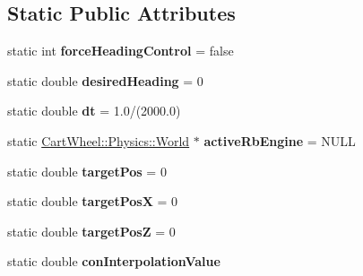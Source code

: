 \subsection*{Static Public Attributes}
\begin{DoxyCompactItemize}
\item 
\hypertarget{classCartWheel_1_1Core_1_1SimGlobals_a1040005439b9320e9456935548db3b07}{
static int {\bfseries forceHeadingControl} = false}
\label{classCartWheel_1_1Core_1_1SimGlobals_a1040005439b9320e9456935548db3b07}

\item 
\hypertarget{classCartWheel_1_1Core_1_1SimGlobals_acb2a9bbb3eec104b912c9d5d411ea239}{
static double {\bfseries desiredHeading} = 0}
\label{classCartWheel_1_1Core_1_1SimGlobals_acb2a9bbb3eec104b912c9d5d411ea239}

\item 
\hypertarget{classCartWheel_1_1Core_1_1SimGlobals_a2c9bfa76224e96109d71bd2b9ffd6e3e}{
static double {\bfseries dt} = 1.0/(2000.0)}
\label{classCartWheel_1_1Core_1_1SimGlobals_a2c9bfa76224e96109d71bd2b9ffd6e3e}

\item 
\hypertarget{classCartWheel_1_1Core_1_1SimGlobals_accc541d005694a2b9575d92b4993b4da}{
static \hyperlink{classCartWheel_1_1Physics_1_1World}{CartWheel::Physics::World} $\ast$ {\bfseries activeRbEngine} = NULL}
\label{classCartWheel_1_1Core_1_1SimGlobals_accc541d005694a2b9575d92b4993b4da}

\item 
\hypertarget{classCartWheel_1_1Core_1_1SimGlobals_a9b904f55f6e835ee55eb271d48fc7069}{
static double {\bfseries targetPos} = 0}
\label{classCartWheel_1_1Core_1_1SimGlobals_a9b904f55f6e835ee55eb271d48fc7069}

\item 
\hypertarget{classCartWheel_1_1Core_1_1SimGlobals_acf0ce9bf9ed648896e962426602cfa24}{
static double {\bfseries targetPosX} = 0}
\label{classCartWheel_1_1Core_1_1SimGlobals_acf0ce9bf9ed648896e962426602cfa24}

\item 
\hypertarget{classCartWheel_1_1Core_1_1SimGlobals_ab3188cbc0b1924c80bcfdf565e1dfc7a}{
static double {\bfseries targetPosZ} = 0}
\label{classCartWheel_1_1Core_1_1SimGlobals_ab3188cbc0b1924c80bcfdf565e1dfc7a}

\item 
\hypertarget{classCartWheel_1_1Core_1_1SimGlobals_ac7b4d6f0798a935ed94ecdc1dbed4d50}{
static double {\bfseries conInterpolationValue}}
\label{classCartWheel_1_1Core_1_1SimGlobals_ac7b4d6f0798a935ed94ecdc1dbed4d50}


\end{DoxyCompactItemize}
